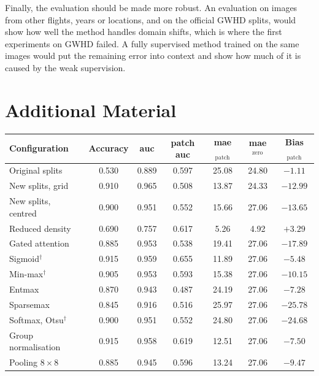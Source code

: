 \documentclass[12pt,parskip = half, DIV=classic,listof=totoc]{scrartcl}
\begin{document}
			Finally, the evaluation should be made more robust. An evaluation on images from other flights, years or 
			locations, and on the official GWHD splits, would show how well the method handles domain shifts, which is 
			where the first experiments on GWHD failed. A fully supervised method trained on the same images would put the 
			remaining error into context and show how much of it is caused by the weak supervision.

	\newpage
	\printbibliography
	\appendix

	\section{Additional Material}
				\begin{table}[htbp]
					\centering
					\footnotesize
					\begin{tabular}{@{}lcccccc@{}}
						\toprule
						Configuration & Accuracy & \acs*{auc} & patch \acs*{auc}
							& \acs*{mae}$_{\text{patch}}$ & \acs*{mae}$^{\text{zero}}$ & Bias$_{\text{patch}}$ \\
						\midrule
						Original splits          & 0.530 & 0.889 & 0.597 & 25.08 & 24.80 & $-1.11$ \\
						New splits, grid         & 0.910 & 0.965 & 0.508 & 13.87 & 24.33 & $-12.99$ \\
						New splits, centred      & 0.900 & 0.951 & 0.552 & 15.66 & 27.06 & $-13.65$ \\
						Reduced density          & 0.690 & 0.757 & 0.617 &  5.26 & 4.92 & $+3.29$ \\
						\midrule
						Gated attention          & 0.885 & 0.953 & 0.538 & 19.41 & 27.06 & $-17.89$ \\
						Sigmoid$^\dagger$        & 0.915 & 0.959 & 0.655 & 11.89 & 27.06 & $-5.48$ \\
						Min-max$^\dagger$        & 0.905 & 0.953 & 0.593 & 15.38 & 27.06 & $-10.15$ \\
						Entmax                   & 0.870 & 0.943 & 0.487 & 24.19 & 27.06 & $-7.28$ \\
						Sparsemax                & 0.845 & 0.916 & 0.516 & 25.97 & 27.06 & $-25.78$ \\
						Softmax, Otsu$^\dagger$  & 0.900 & 0.951 & 0.552 & 24.80 & 27.06 & $-24.68$ \\
						\midrule
						Group normalisation      & 0.915 & 0.958 & 0.619 & 12.51 & 27.06 & $-7.50$ \\
						Pooling $8\times8$       & 0.885 & 0.945 & 0.596 & 13.24 & 27.06 & $-9.47$ \\

\end{tabular}
\end{table}
\end{document}
